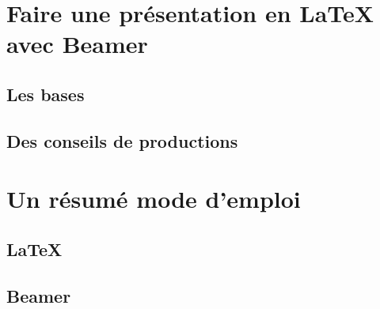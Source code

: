 \documentclass[10pt,t]{beamer}
\begin{document}

\section{Faire une présentation en \LaTeX{} avec Beamer}

\subsection{Les bases}


\subsection{Des conseils de productions}


\section{Un résumé mode d'emploi}

\subsection{\LaTeX{}}


\subsection{Beamer}



\end{document}
